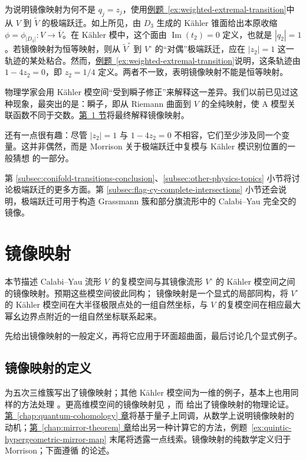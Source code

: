 为说明镜像映射为何不是 $q_j=z_j$，使用\hyperref[ex:weighted-extremal-transition]{例题~\ref*{ex:weighted-extremal-transition}}中从 $V$ 到 $\widetilde V$ 的极端跃迁。如上所见，由 $D_3$ 生成的 Kähler 锥面给出本原收缩 $\phi=\phi_{|D_3|}:V\to\overline V$。在 Kähler 模中，这个面由 $\operatorname{Im}(t_2)=0$ 定义，也就是 $|q_2|=1$。若镜像映射为恒等映射，则从 $\widetilde V^\circ$ 到 $V^\circ$ 的“对偶”极端跃迁，应在 $|z_2|=1$ 这一轨迹的某处粘合。然而，\hyperref[ex:weighted-extremal-transition]{例题~\ref*{ex:weighted-extremal-transition}}说明，这条轨迹由 $1-4z_2=0$，即 $z_2=1/4$ 定义。两者不一致，表明镜像映射不能是恒等映射。

物理学家会用 Kähler 模空间“受到瞬子修正”来解释这一差异。我们以前已见过这种现象，最突出的是：瞬子，即从 Riemann 曲面到 $V$ 的全纯映射，使 A 模型关联函数不同于交数。\hyperref[sec:mirror-map]{第~\ref*{sec:mirror-map} 节}将最终解释镜像映射。

还有一点很有趣：尽管 $|z_2|=1$ 与 $1-4z_2=0$ 不相容，它们至少涉及同一个变量。这并非偶然，而是 Morrison 关于极端跃迁中复模与 Kähler 模识别位置的一般猜想  的一部分。

第 \hyperref[subsec:conifold-transitions-conclusion]{\ref*{subsec:conifold-transitions-conclusion}}、\hyperref[subsec:other-physics-topics]{\ref*{subsec:other-physics-topics}} 小节将讨论极端跃迁的更多方面。第 \hyperref[subsec:flag-cy-complete-intersections]{\ref*{subsec:flag-cy-complete-intersections}} 小节还会说明，极端跃迁可用于构造 Grassmann 簇和部分旗流形中的 Calabi--Yau 完全交的镜像。

\section{镜像映射}\label{sec:mirror-map}
本节描述 Calabi--Yau 流形 $V$ 的复模空间与其镜像流形 $V^\circ$ 的 Kähler 模空间之间的镜像映射。预期这些模空间彼此同构；
镜像映射是一个显式的局部同构，将 $V^\circ$ 的 Kähler 模空间在大半径极限点处的一组自然坐标，与 $V$ 的复模空间在相应最大幂幺边界点附近的一组自然坐标联系起来。

先给出镜像映射的一般定义，再将它应用于环面超曲面，最后讨论几个显式例子。

\subsection{镜像映射的定义}\label{subsec:mirror-map-definition}
 为五次三维簇写出了镜像映射；其他 Kähler 模空间为一维的例子，基本上也用同样的方法处理 。更高维模空间的镜像映射见 ，而  给出了镜像映射的物理论证。\hyperref[chap:quantum-cohomology]{第~\ref*{chap:quantum-cohomology} 章}将基于量子上同调，从数学上说明镜像映射的动机；\hyperref[chap:mirror-theorem]{第~\ref*{chap:mirror-theorem} 章}给出另一种计算它的方法，例题~\ref{ex:quintic-hypergeometric-mirror-map} 末尾将透露一点线索。镜像映射的纯数学定义归于 Morrison；下面遵循  的论述。

